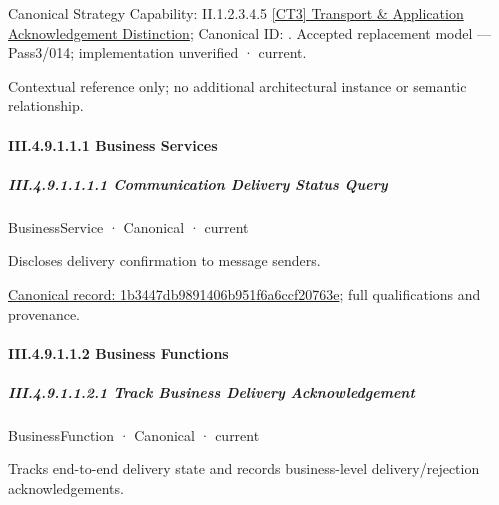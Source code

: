 {\small Canonical Strategy Capability: II.1.2.3.4.5 \hyperref[element:f726b4cecd714ab084e6cce3b0874e85]{[CT3] Transport \& Application Acknowledgement Distinction}; Canonical ID: \texttt{}. Accepted replacement model — Pass3/014; implementation unverified · current.}\par
Contextual reference only; no additional architectural instance or semantic relationship.\par
\paragraph*{III.4.9.1.1.1 Business Services}
\label{navigation:III.4.9.1.1.1}

\subparagraph*{III.4.9.1.1.1.1 Communication Delivery Status Query}
\label{navigation:III.4.9.1.1.1.1}

\label{element:1b3447db9891406b951f6a6ccf20763e}
{\small BusinessService · Canonical · current}\par

Discloses delivery confirmation to message senders.


{\footnotesize \href{../../../../../../../../continuum/business/business-service/1b3447db9891406b951f6a6ccf20763e.md}{Canonical record: 1b3447db9891406b951f6a6ccf20763e}; full qualifications and provenance.}\par
\paragraph*{III.4.9.1.1.2 Business Functions}
\label{navigation:III.4.9.1.1.2}

\subparagraph*{III.4.9.1.1.2.1 Track Business Delivery Acknowledgement}
\label{navigation:III.4.9.1.1.2.1}

\label{element:75fb22db4c2346b99fd7c788264abb5d}
{\small BusinessFunction · Canonical · current}\par

Tracks end-to-end delivery state and records business-level delivery/rejection acknowledgements.


